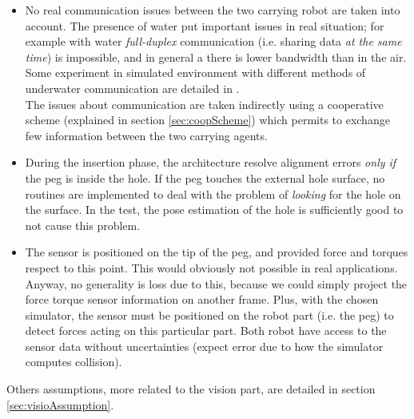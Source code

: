 \begin{itemize}
	\item No real communication issues between the two carrying robot are taken into account. The presence of water put important issues in real situation; for example with water \textit{full-duplex} communication (i.e. sharing data \textit{at the same time}) is impossible, and in general a there is lower bandwidth than in the air. Some experiment in simulated environment with different methods of underwater communication are detailed in \cite{IntroMaris2}.\\
	The issues about communication are taken indirectly using a cooperative scheme (explained in section \ref{sec:coopScheme}) which permits to exchange few information between the two carrying agents.
	
    \item During the insertion phase, the architecture resolve alignment errors \textit{only if} the peg is inside the hole. If the peg touches the external hole surface, no routines are implemented to deal with the problem of \textit{looking} for the hole on the surface. In the test, the pose estimation of the hole is sufficiently good to not cause this problem.
	
	\item The sensor is positioned on the tip of the peg, and provided force and torques respect to this point. This would obviously not possible in real applications. Anyway, no generality is loss due to this, because we could simply project the force torque sensor information on another frame. Plus, with the chosen simulator, the sensor must be positioned on the robot part (i.e. the peg) to detect forces acting on this particular part. Both robot have access to the sensor data without uncertainties (expect error due to how the simulator computes collision).
	
\end{itemize}

Others assumptions, more related to the vision part, are detailed in section \ref{sec:visioAssumption}.



